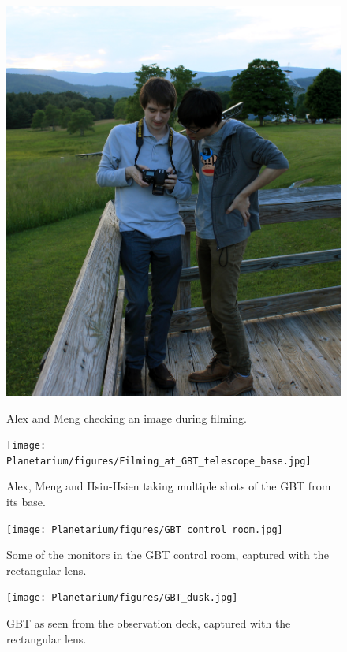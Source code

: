 \begin{figure}[htb]
\centering
\begin{minipage}[b]{0.39\textwidth}
\centering
\includegraphics[width=0.95\linewidth]{Planetarium/figures/Filming_at_GBT_obs_deck.jpg}
\caption{Alex and Meng checking an image during filming.}
\label{Fig:GBT_obs_deck_film}
\end{minipage}%
\begin{minipage}[b]{0.02\textwidth}
\hspace{1cm}
\end{minipage}%
\begin{minipage}[b]{0.55\textwidth}
\centering
\texttt{[image: Planetarium/figures/Filming\_at\_GBT\_telescope\_base.jpg]}
\caption{Alex, Meng and Hsiu-Hsien taking multiple shots of the GBT from its base.}
\label{Fig:GBT_base_film}
\end{minipage}
\end{figure}

\begin{figure}[htb]
\centering
\begin{minipage}[b]{0.55\textwidth}
\centering
\texttt{[image: Planetarium/figures/GBT\_control\_room.jpg]}
\caption{Some of the monitors in the GBT control room, captured with the rectangular lens. }
\label{Fig:GBT_control}
\end{minipage}%
\begin{minipage}[b]{0.02\textwidth}
\hspace{1cm}
\end{minipage}%
\begin{minipage}[b]{0.42\textwidth}
\centering
\texttt{[image: Planetarium/figures/GBT\_dusk.jpg]}
\caption{GBT as seen from the observation deck, captured with the rectangular lens.}
\label{Fig:GBT_dusk}
\end{minipage}
\end{figure}


